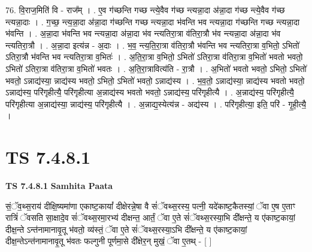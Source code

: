 \documentclass[17pt]{extarticle}
\begin{document}
76. वि॒राज॒मिति॑ वि - राज᳚म् । . ए॒व ग॑च्छन्ति गच्छ न्त्ये॒वैव ग॑च्छ न्त्यन्ना॒दा अ॑न्ना॒दा ग॑च्छ न्त्ये॒वैव ग॑च्छ न्त्यन्ना॒दाः । . ग॒च्छ॒ न्त्य॒न्ना॒दा अ॑न्ना॒दा ग॑च्छन्ति गच्छ न्त्यन्ना॒दा भ॑वन्ति भव न्त्यन्ना॒दा ग॑च्छन्ति गच्छ न्त्यन्ना॒दा भ॑वन्ति । . अ॒न्ना॒दा भ॑वन्ति भव न्त्यन्ना॒दा अ॑न्ना॒दा भ॑व न्त्यतिरा॒त्रा व॑तिरा॒त्रौ भ॑व न्त्यन्ना॒दा अ॑न्ना॒दा भ॑व न्त्यतिरा॒त्रौ । . अ॒न्ना॒दा इत्य॑न्न - अ॒दाः । . भ॒व॒ न्त्य॒ति॒रा॒त्रा व॑तिरा॒त्रौ भ॑वन्ति भव न्त्यतिरा॒त्रा व॒भितो॒ ऽभितो॑ ऽतिरा॒त्रौ भ॑वन्ति भव न्त्यतिरा॒त्रा व॒भितः॑ । . अ॒ति॒रा॒त्रा व॒भितो॒ ऽभितो॑ ऽतिरा॒त्रा व॑तिरा॒त्रा व॒भितो॑ भवतो भवतो॒ ऽभितो॑ ऽतिरा॒त्रा व॑तिरा॒त्रा व॒भितो॑ भवतः । . अ॒ति॒रा॒त्रावित्य॑ति - रा॒त्रौ । . अ॒भितो॑ भवतो भवतो॒ ऽभितो॒ ऽभितो॑ भवतो॒ ऽन्नाद्य॑स्या॒ न्नाद्य॑स्य भवतो॒ ऽभितो॒ ऽभितो॑ भवतो॒ ऽन्नाद्य॑स्य । . भ॒व॒तो॒ ऽन्नाद्य॑स्या॒ न्नाद्य॑स्य भवतो भवतो॒ ऽन्नाद्य॑स्य॒ परि॑गृहीत्यै॒ परि॑गृहीत्या अ॒न्नाद्य॑स्य भवतो भवतो॒ ऽन्नाद्य॑स्य॒ परि॑गृहीत्यै । . अ॒न्नाद्य॑स्य॒ परि॑गृहीत्यै॒ परि॑गृहीत्या अ॒न्नाद्य॑स्या॒ न्नाद्य॑स्य॒ परि॑गृहीत्यै । . अ॒न्नाद्य॒स्येत्य॑न्न - अद्य॑स्य । . परि॑गृहीत्या॒ इति॒ परि॑ - गृ॒ही॒त्यै॒ । \newline
\pagebreak
{}

\section{ TS 7.4.8.1 }

\textbf{TS 7.4.8.1 } \newline
\textbf{Samhita Paata} \newline

सं॒ॅव॒थ्स॒राय॑ दीक्षि॒ष्यमा॑णा एकाष्ट॒कायां᳚ दीक्षेरन्ने॒षा वै सं॑ॅवथ्स॒रस्य॒ पत्नी॒ यदे॑काष्ट॒कैतस्यां॒ ॅवा ए॒ष ए॒ताꣳ रात्रिं॑ ॅवसति सा॒क्षादे॒व सं॑ॅवथ्स॒रमा॒रभ्य॑ दीक्षन्त॒ आर्तं॒ ॅवा ए॒ते सं॑ॅवथ्स॒रस्या॒भि दी᳚क्षन्ते॒ य ए॑काष्ट॒कायां॒ दीक्ष॒न्ते ऽन्त॑नामानावृ॒तू भ॑वतो॒ व्य॑स्तं॒ ॅवा ए॒ते सं॑ॅवथ्स॒रस्या॒ऽभि दी᳚क्षन्ते॒ य ए॑काष्ट॒कायां॒ दीक्ष॒न्तेऽन्त॑नामानावृ॒तू भ॑वतः फल्गुनी पूर्णमा॒से दी᳚क्षेर॒न् मुखं॒ ॅवा ए॒तथ् - [  ] \newline
\end{document}

